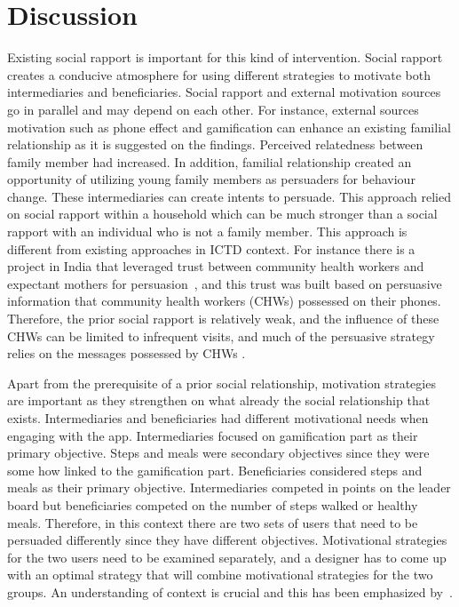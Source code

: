 \section{Discussion}
Existing social rapport is important for this kind of intervention. Social rapport creates a conducive atmosphere for using different strategies to motivate both intermediaries and beneficiaries. Social rapport and external motivation sources go in parallel and may depend on each other. For instance,  external sources motivation such as phone effect and gamification can enhance an existing familial relationship as it is suggested on the findings. Perceived relatedness between family member had increased. In addition, familial relationship created an opportunity of utilizing young family members as persuaders for behaviour change. These intermediaries can create intents to persuade. This approach relied on social rapport within a household which can be much stronger than a social rapport with an individual who is not a family member. This approach is different from existing approaches in ICTD context.  For instance there is a project in India that leveraged trust between community health workers and expectant mothers for  persuasion~\citep{ramachandran2010mobile,ramachandran2010research}, and this trust was built based on persuasive information that community health workers (CHWs) possessed on their phones. Therefore, the prior social rapport is relatively weak, and the  influence of these CHWs can be limited to infrequent visits, and much of the persuasive strategy relies on the messages possessed by CHWs \citep{katule2016leveraging}.  

Apart from the prerequisite of a prior social relationship, motivation strategies are important as they strengthen on what already the social relationship  that exists. Intermediaries and beneficiaries had different motivational needs when engaging with the app. Intermediaries focused on gamification part as their primary objective. Steps and meals were secondary objectives since they were some how linked to the gamification part. Beneficiaries considered steps and meals as their primary objective. Intermediaries competed in points on the leader board but beneficiaries competed on the number of steps walked or healthy meals. Therefore, in this context there are two sets of users that need to be persuaded differently since they have different objectives. Motivational strategies for the two users need to be examined separately, and a designer has to come up with an optimal strategy that will combine motivational strategies for the two groups. An understanding of context is crucial and this has been emphasized by~\citep{Oinas-kukkonen:psd, Oinas-Kukkonen:foundation}. 


